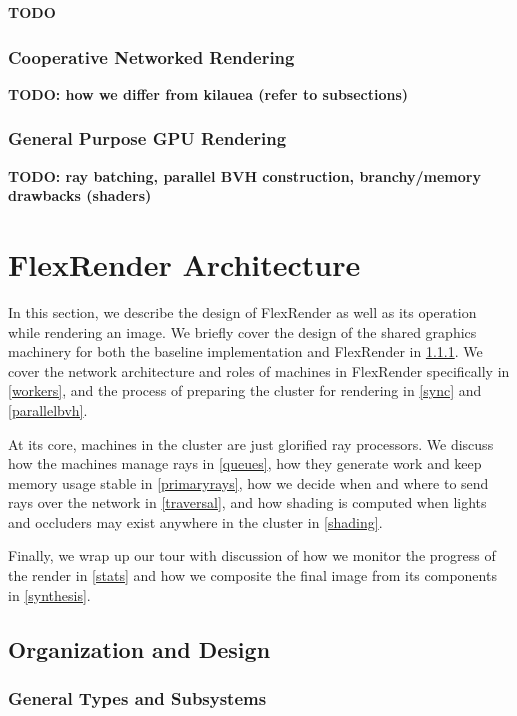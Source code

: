 \documentclass[12pt]{ucthesis}
\begin{document}
\textbf{TODO}

\subsection{Cooperative Networked Rendering}
\label{networked}

\textbf{TODO: how we differ from kilauea (refer to subsections) \cite{kato:2002}}

\subsection{General Purpose GPU Rendering}
\label{gpgpu}

\textbf{TODO: ray batching, parallel BVH construction, branchy/memory drawbacks (shaders)}

\chapter{FlexRender Architecture}
\label{architecture}

In this section, we describe the design of FlexRender as well as its operation
while rendering an image. We briefly cover the design of the shared graphics
machinery for both the baseline implementation and FlexRender in \ref{types}.
We cover the network architecture and roles of machines in FlexRender
specifically in \ref{workers}, and the process of preparing the cluster for
rendering in \ref{sync} and \ref{parallelbvh}.

At its core, machines in the cluster are just glorified ray processors. We
discuss how the machines manage rays in \ref{queues}, how they generate work
and keep memory usage stable in \ref{primaryrays}, how we decide when and where
to send rays over the network in \ref{traversal}, and how shading is computed
when lights and occluders may exist anywhere in the cluster in \ref{shading}.

Finally, we wrap up our tour with discussion of how we monitor the progress
of the render in \ref{stats} and how we composite the final image from its
components in \ref{synthesis}.

\section{Organization and Design}
\label{organization}

\subsection{General Types and Subsystems}
\label{types}
\end{document}
